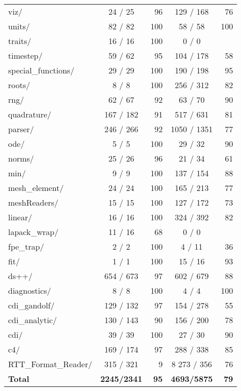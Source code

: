 \begin{table}
\begin{center}
\begin{tabular}{lcrcr}
viz/                 &   24 /    25 &  96 &    129 /   168 &  76  \\
units/               &   82 /    82 & 100 &     58 /    58 & 100 \\
traits/              &   16 /    16 & 100 &      0 /     0        \\
timestep/            &   59 /    62 &  95 &    104 /   178 &  58 \\
special\_functions/  &   29 /    29 & 100 &    190 /   198 &  95 \\
roots/               &    8 /     8 & 100 &    256 /   312 &  82 \\
rng/                 &   62 /    67 &  92 &     63 /    70 &  90 \\
quadrature/          &  167 /   182 &  91 &    517 /   631 &  81 \\
parser/              &  246 /   266 &  92 &   1050 /  1351 &  77 \\
ode/                 &    5 /     5 & 100 &     29 /    32 &  90 \\
norms/               &   25 /    26 &  96 &     21 /    34 &  61 \\
min/                 &    9 /     9 & 100 &    137 /   154 &  88 \\
mesh\_element/       &    24 /    24 & 100&     165 /   213 &  77 \\
meshReaders/         &   15 /    15 & 100 &    127 /   172 &  73 \\
linear/              &   16 /    16 & 100 &    324 /   392 &  82 \\
lapack\_wrap/        &    11 /    16 &  68&       0 /     0        \\
fpe\_trap/           &     2 /     2 & 100&       4 /    11 &  36 \\
fit/                 &    1 /     1 & 100 &     15 /    16 &  93 \\
ds++/                &  654 /   673 &  97 &    602 /   679 &  88 \\
diagnostics/         &    8 /     8 & 100 &      4 /     4 & 100 \\
cdi\_gandolf/        &   129 /   132 &  97&     154 /   278 &  55 \\
cdi\_analytic/       &   130 /   143 &  90&     156 /   200 &  78 \\
cdi/                 &   39 /    39 & 100 &     27 /    30 &  90 \\
c4/                  &  169 /   174 &  97 &    288 /   338 &  85 \\
RTT\_Format\_Reader/ &    315 /   321 &  9&8     273 /   356 &  76 \\

     \hline
      {\bf Total} & {\bf 2245/2341} & {\bf 95} & {\bf 4693/5875} & {\bf 79} \\

      \hline\hline
    \end{tabular}
  \end{center}
\end{table}

